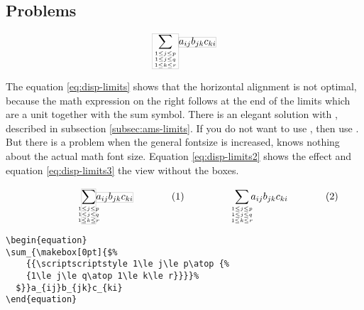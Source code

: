 \subsection{Problems}

\begin{equation}\label{eq:disp-limits}
\fboxsep=0pt\fboxrule=0.1pt
\boxed{\sum_{
	{{1\le j\le p\atop {%
		{1\le j\le q\atop 1\le k\le r}}}%
	}}%
}\boxed{a_{ij}b_{jk}c_{ki}}
\end{equation}

The equation \ref{eq:disp-limits} shows that the horizontal alignment
is not optimal, because the math expression on the right follows at the
end of the limits which are a unit together with the sum symbol. There
is an elegant solution with \AmSmath, described in subsection
\vref{subsec:ams-limits}. If you do not want to use \AmSmath,
then use . But there is a problem when the general fontsize
is increased,  knows nothing about the actual math font
size. Equation \ref{eq:disp-limits2} shows the effect and equation
\ref{eq:disp-limits3} the view without the boxes.

\vspace{\abovedisplayskip}
\begin{subequations}
\begin{minipage}{0.45\textwidth}
\begin{equation}\label{eq:disp-limits2}
\fboxsep=0pt\fboxrule=0.1pt
\boxed{\sum_{%
	\makebox[0pt]{$%
		{{\scriptscriptstyle 1\le j\le p\atop {%
		{1\le j\le q\atop 1\le k\le r}}}}%
	$}%
	}%
}\boxed{a_{ij}b_{jk}c_{ki}}
\end{equation}
\end{minipage}\hfill
\begin{minipage}{0.45\textwidth}
\begin{equation}\label{eq:disp-limits3}
\sum_{%
	\makebox[0pt]{$%
		{{\scriptscriptstyle 1\le j\le p\atop {%
		{1\le j\le q\atop 1\le k\le r}}}}%
	$}}a_{ij}b_{jk}c_{ki}
\end{equation}
\end{minipage}
\end{subequations}

\medskip
\begin{lstlisting}
\begin{equation}
\sum_{\makebox[0pt]{$%
	{{\scriptscriptstyle 1\le j\le p\atop {%
	{1\le j\le q\atop 1\le k\le r}}}}%
  $}}a_{ij}b_{jk}c_{ki}
\end{equation}
\end{lstlisting}



